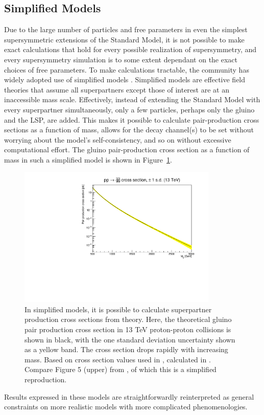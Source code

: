   \subsection{Simplified Models} \label{sec:SUSYsms}

  Due to the large number of particles and free parameters in even the simplest supersymmetric extensions of the Standard Model, it is not possible to make exact calculations that hold for every possible realization of supersymmetry, and every supersymmetry simulation is to some extent dependant on the exact choices of free parameters.
  To make calculations tractable, the community has widely adopted use of simplified models \cite{SMS}.
  Simplified models are effective field theories that assume all superpartners except those of interest are at an inaccessible mass scale.
  Effectively, instead of extending the Standard Model with every superpartner simultaneously, only a few particles, perhaps only the gluino and the LSP, are added.
  This makes it possible to calculate pair-production cross sections as a function of mass, allows for the decay channel(s) to be set without worrying about the model's self-consistency, and so on without excessive computational effort.
  The gluino pair-production cross section as a function of mass in such a simplified model is shown in Figure~\ref{fig:SUSYxsec}.
  \begin{figure}[h!]
    \centering
    \includegraphics[width=0.85\textwidth]{figures/gluino_xsec.pdf}
    \caption[Theoretical gluino pair production cross section in simplified models.]{In simplified models, it is possible to calculate superpartner production cross sections from theory.
Here, the theoretical gluino pair production cross section in 13 TeV proton-proton collisions is shown in black, with the one standard deviation uncertainty shown as a yellow band.
The cross section drops rapidly with increasing mass.
Based on cross section values used in \cite{MT2_2019}, calculated in \cite{SUSYxsecs}.
Compare Figure 5 (upper) from \cite{SUSYxsecs}, of which this is a simplified reproduction.
}
    \label{fig:SUSYxsec}
  \end{figure}  
  Results expressed in these models are straightforwardly reinterpreted as general constraints on more realistic models with more complicated phenomenologies.

